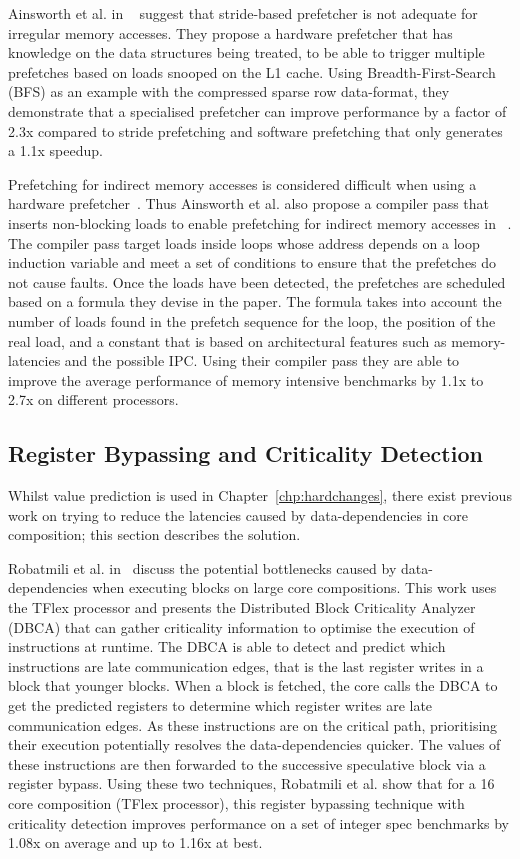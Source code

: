 Ainsworth et al. in ~\cite{graphPrefetch2016} suggest that stride-based prefetcher is not adequate for irregular memory accesses.
They propose a hardware prefetcher that has knowledge on the data structures being treated, to be able to trigger multiple prefetches based on loads snooped on the L1 cache.
Using Breadth-First-Search (BFS) as an example with the compressed sparse row data-format, they demonstrate that a specialised prefetcher can improve performance by a factor of 2.3x compared to stride prefetching and software prefetching that only generates a 1.1x speedup.

Prefetching for indirect memory accesses is considered difficult when using a hardware prefetcher~\cite{lee2012whenprefetchworks,prefetchForIndirect2017}.
Thus Ainsworth et al. also propose a compiler pass that inserts non-blocking loads to enable prefetching for indirect memory accesses in ~\cite{prefetchForIndirect2017}.
The compiler pass target loads inside loops whose address depends on a loop induction variable and meet a set of conditions to ensure that the prefetches do not cause faults.
Once the loads have been detected, the prefetches are scheduled based on a formula they devise in the paper.
The formula takes into account the number of loads found in the prefetch sequence for the loop, the position of the real load, and a constant that is based on architectural features such as memory-latencies and the possible IPC.
Using their compiler pass they are able to improve the average performance of memory intensive benchmarks by 1.1x to 2.7x on different processors.
\vspace{-1em}
\subsection{Register Bypassing and Criticality Detection}
Whilst value prediction is used in Chapter~\ref{chp:hardchanges}, there exist previous work on trying to reduce the latencies caused by data-dependencies in core composition; this section describes the solution.

Robatmili et al. in~\cite{robatmili2011uniproc} discuss the potential bottlenecks caused by data-dependencies when executing blocks on large core compositions.
This work uses the TFlex processor and presents the Distributed Block Criticality Analyzer (DBCA) that can gather criticality information to optimise the execution of instructions at runtime.
The DBCA is able to detect and predict which instructions are late communication edges, that is the last register writes in a block that younger blocks.
When a block is fetched, the core calls the DBCA to get the predicted registers to determine which register writes are late communication edges.
As these instructions are on the critical path, prioritising their execution potentially resolves the data-dependencies quicker.
The values of these instructions are then forwarded to the successive speculative block via a register bypass.
Using these two techniques, Robatmili et al. show that for a 16 core composition (TFlex processor), this register bypassing technique with criticality detection improves performance on a set of integer spec benchmarks by 1.08x on average and up to 1.16x at best.\

